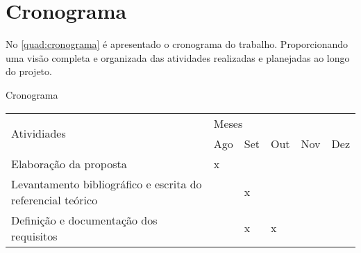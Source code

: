 \chapter{Cronograma}\label{cap:cronograma}

No \autoref{quad:cronograma} é apresentado o cronograma do trabalho. Proporcionando uma visão completa e organizada das atividades realizadas e planejadas ao longo do projeto.

\begin{tabframed}[htb]
  \caption{Cronograma}
  \label{quad:cronograma}
  \renewcommand{\arraystretch}{1.5}
  \begin{tabular}{|l|lllll|}
    \hline
    \multirow{2}{*}{Atividiades}                                &
    \multicolumn{5}{l|}{Meses}
    \\ \cline{2-6}

                                                                &
    \multicolumn{1}{l|}{Ago}                                    &
    \multicolumn{1}{l|}{Set}                                    &
    \multicolumn{1}{l|}{Out}                                    &
    \multicolumn{1}{l|}{Nov}                                    &
    \multicolumn{1}{l|}{Dez}
    \\ \hline

    Elaboração da proposta                                      &
    \multicolumn{1}{l|}{x}                                      &
    \multicolumn{1}{l|}{}                                       &
    \multicolumn{1}{l|}{}                                       &
    \multicolumn{1}{l|}{}                                       &
    \\ \hline

    Levantamento bibliográfico e escrita do referencial teórico &
    \multicolumn{1}{l|}{}                                       &
    \multicolumn{1}{l|}{x}                                      &
    \multicolumn{1}{l|}{}                                       &
    \multicolumn{1}{l|}{}                                       &
    \\ \hline

    Definição e documentação dos requisitos                     &
    \multicolumn{1}{l|}{}                                       &
    \multicolumn{1}{l|}{x}                                      &
    \multicolumn{1}{l|}{x}                                      &
    \multicolumn{1}{l|}{}                                       &
    \\ \hline


\end{tabular}
\end{tabframed}
